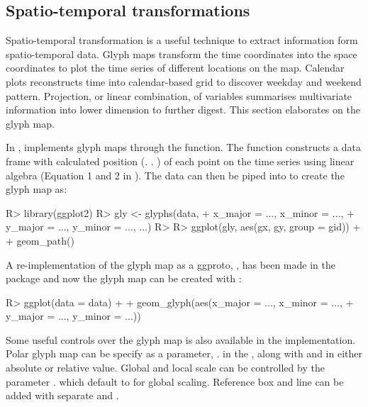 \documentclass[
]{jss}
\begin{document}
\hypertarget{spatio-temporal-transformations}{%
\subsection{Spatio-temporal
transformations}\label{spatio-temporal-transformations}}

Spatio-temporal transformation is a useful technique to extract
information form spatio-temporal data. Glyph maps \citep{Wickham2012-yr}
transform the time coordinates into the space coordinates to plot the
time series of different locations on the map. Calendar plots
\citep{wang2020calendar} reconstructs time into calendar-based grid to
discover weekday and weekend pattern. Projection, or linear combination,
of variables summarises multivariate information into lower dimension to
further digest. This section elaborates on the glyph map.

In ,  implements glyph maps through the
 function. The function constructs a data frame with
calculated position (. . ) of each point on
the time series using linear algebra (Equation 1 and 2 in
\citet{Wickham2012-yr}). The data can then be piped into 
to create the glyph map as:

\begin{CodeChunk}
\begin{CodeInput}
R> library(ggplot2)
R> gly <- glyphs(data, 
+               x_major = ..., x_minor = ..., 
+               y_major = ..., y_minor = ..., ...)
R> 
R> ggplot(gly, aes(gx, gy, group = gid)) + 
+   geom_path() 
\end{CodeInput}
\end{CodeChunk}

A re-implementation of the glyph map as a ggproto, , has
been made in the  package and now the glyph map can be
created with :

\begin{CodeChunk}
\begin{CodeInput}
R> ggplot(data = data) +
+   geom_glyph(aes(x_major = ..., x_minor = ..., 
+                  y_major = ..., y_minor = ...))
\end{CodeInput}
\end{CodeChunk}

Some useful controls over the glyph map is also available in the
 implementation. Polar glyph map can be specify as a
parameter, . in the , along with
 and  in either absolute or relative value.
Global and local scale can be controlled by the parameter
. which default to  for global scaling.
Reference box and line can be added with separate
 and .
\end{document}
